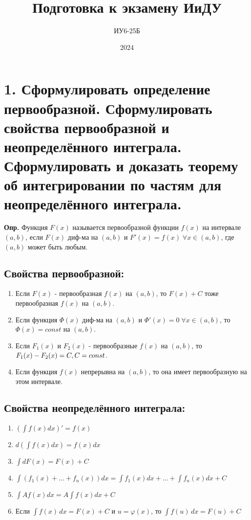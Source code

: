 \documentclass[11pt]{article}
\title{Подготовка к экзамену ИиДУ}
\author{ИУ6-25Б}
\date{2024}
\begin{document}
\maketitle

\section*{1. Сформулировать определение первообразной. Сформулировать свойства первообразной и неопределённого интеграла. Сформулировать и доказать теорему об интегрировании по частям для неопределённого интеграла.}
\textbf{Опр.} Функция \(F(x)\) называется первообразной функции \(f(x)\) на интервале \((a, b)\), если \(F(x)\) диф-ма на \((a, b)\) и \(F'(x)=f(x) \; \forall x \in (a, b)\), где \((a, b)\) может быть любым.
\subsection*{Свойства первообразной:}
\begin{enumerate}
\item Если \(F(x)\) - первообразная \(f(x)\) на \((a, b)\), то \(F(x) + C\) тоже первообразная \(f(x)\) на \((a, b)\).
\item Если функция \(\Phi(x)\) диф-ма на \((a, b)\) и \(\Phi'(x) = 0 \; \forall x\in (a, b)\), то \(\Phi(x) = const\) на \((a, b)\).
\item Если \(F_1(x)\) и \(F_2(x)\) - первообразные \(f(x)\) на \((a, b)\), то \(F_1(x) - F_2(x) = C,\space C = const\).
\item Если функция \(f(x)\) непрерывна на \((a, b)\), то она имеет первообразную на этом интервале.
\end{enumerate}

\subsection*{Свойства неопределённого интеграла:}
\begin{enumerate}
\item \((\int f(x)dx)'=f(x)\)
\item \(d(\int f(x)dx)=f(x)dx\)
\item \(\int dF(x) = F(x) + C\)
\item \(\int (f_1(x) + ... + f_n(x))dx = \int f_1(x)dx + ... + \int f_n(x)dx + C\)
\item \(\int Af(x)dx = A\int f(x)dx + C\)
\item Если $\int f(x) \, dx = F(x) + C$ и $u = \varphi(x)$, то $\int f(u) \, dx = F(u) + C$
\end{enumerate}
\end{document}
